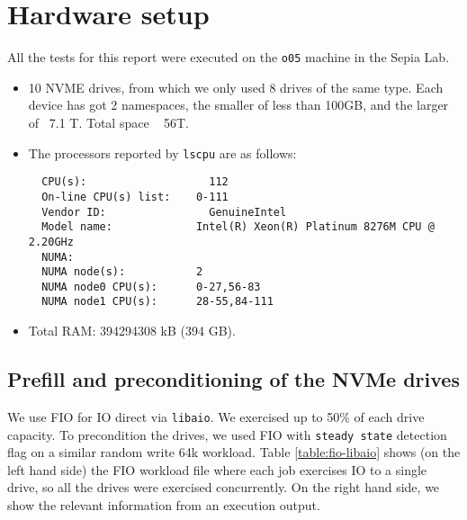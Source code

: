 \chapter{Hardware setup}

All the tests for this report were executed on the {\tt o05} machine in the Sepia Lab.

\begin{itemize}
  \item 10 NVME drives, from which we only used 8 drives of the same type. Each device has got 2 namespaces,
  the smaller of less than 100GB, and the larger of ~7.1 T. Total space ~ 56T.
  \item The processors reported by {\tt lscpu} are as follows:
  \begin{verbatim}
  CPU(s):                   112
  On-line CPU(s) list:    0-111
  Vendor ID:                GenuineIntel
  Model name:             Intel(R) Xeon(R) Platinum 8276M CPU @ 2.20GHz
  NUMA:
  NUMA node(s):           2
  NUMA node0 CPU(s):      0-27,56-83
  NUMA node1 CPU(s):      28-55,84-111
  \end{verbatim}
  \item Total RAM: 394294308 kB (394 GB).
\end{itemize}

\section{Prefill and preconditioning of the NVMe drives}

We use FIO for IO direct via {\tt libaio}. We exercised up to 50\% of each drive capacity. 
To precondition the drives, we used FIO with {\tt steady state} detection flag on a similar random write 64k workload. 
Table \ref{table:fio-libaio} shows (on the left hand side) the FIO workload file where each job exercises IO to a single drive,
so all the drives were exercised concurrently. On the right hand side, we show the relevant information from an execution output.

